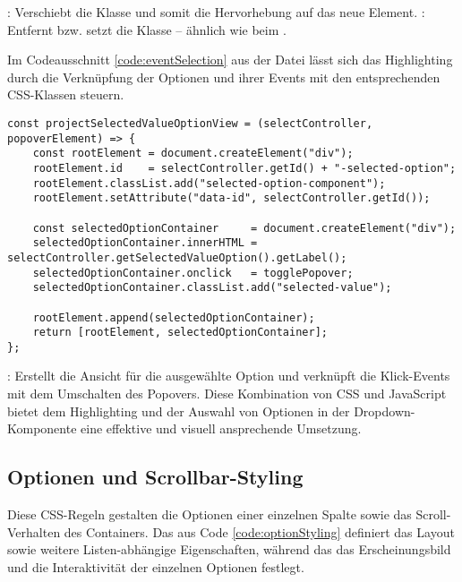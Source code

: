 : Verschiebt die Klasse  und somit die Hervorhebung auf das neue Element. 
: Entfernt bzw. setzt die Klasse  – ähnlich wie beim . 

Im Codeausschnitt \ref{code:eventSelection} aus der Datei  lässt sich das Highlighting durch die Verknüpfung der Optionen und ihrer Events mit den entsprechenden CSS-Klassen steuern. 

\begin{lstlisting}[style = htmlcssjs, caption = Event-Handling für die Auswahl einer Option, label = code:eventSelection]
const projectSelectedValueOptionView = (selectController, popoverElement) => {
    const rootElement = document.createElement("div");
    rootElement.id    = selectController.getId() + "-selected-option";
    rootElement.classList.add("selected-option-component");
    rootElement.setAttribute("data-id", selectController.getId());
    
    const selectedOptionContainer     = document.createElement("div");
    selectedOptionContainer.innerHTML = selectController.getSelectedValueOption().getLabel();
    selectedOptionContainer.onclick   = togglePopover;
    selectedOptionContainer.classList.add("selected-value");
    
    rootElement.append(selectedOptionContainer);
    return [rootElement, selectedOptionContainer];
}; 
\end{lstlisting}

: Erstellt die Ansicht für die ausgewählte Option und verknüpft die Klick-Events mit dem Umschalten des Popovers. 
Diese Kombination von CSS und JavaScript bietet dem Highlighting und der Auswahl von Optionen in der Dropdown-Komponente eine effektive und visuell ansprechende Umsetzung. 


\subsection{Optionen und Scrollbar-Styling}
\label{sec:sizeLayoutChanges}

Diese CSS-Regeln gestalten die Optionen einer einzelnen Spalte sowie das Scroll-Verhalten des Containers. 
Das  aus Code \ref{code:optionStyling} definiert das Layout sowie weitere Listen-abhängige Eigenschaften, während das  das Erscheinungsbild und die Interaktivität der einzelnen Optionen festlegt. 

